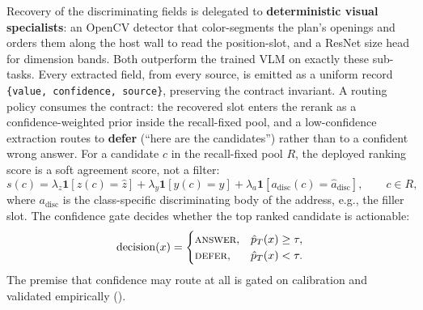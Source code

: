 Recovery of the discriminating fields is delegated to \textbf{deterministic visual specialists}: an
OpenCV detector that color-segments the plan's openings and orders them along the host wall to read
the position-slot, and a ResNet size head for dimension bands. Both outperform the trained
VLM on exactly these sub-tasks. Every extracted field, from every source, is emitted as a uniform
record \texttt{\{value, confidence, source\}}, preserving the contract invariant. A routing policy consumes the
contract: the recovered slot enters the rerank as a confidence-weighted prior inside the recall-fixed
pool, and a low-confidence extraction routes to \textbf{defer} (``here are the candidates'') rather
than to a confident wrong answer. For a candidate $c$ in the recall-fixed pool $R$, the deployed
ranking score is a soft agreement score, not a filter:
\[
s(c)=
\lambda_z\mathbf{1}[z(c)=\hat z]
+\lambda_y\mathbf{1}[y(c)=\hat y]
+\lambda_a\mathbf{1}[a_{\mathrm{disc}}(c)=\hat a_{\mathrm{disc}}],
\qquad c\in R,
\]
where $a_{\mathrm{disc}}$ is the class-specific discriminating body of the address, e.g., the filler
slot. The confidence gate decides whether the top ranked candidate is actionable:
\[
\operatorname{decision}(x)=
\begin{cases}
\textsc{answer}, & \hat p_T(x)\ge\tau,\\
\textsc{defer}, & \hat p_T(x)<\tau.
\end{cases}
\]
The premise that confidence may route at all is gated on calibration
\citep{guo2017calibration} and validated empirically ().
